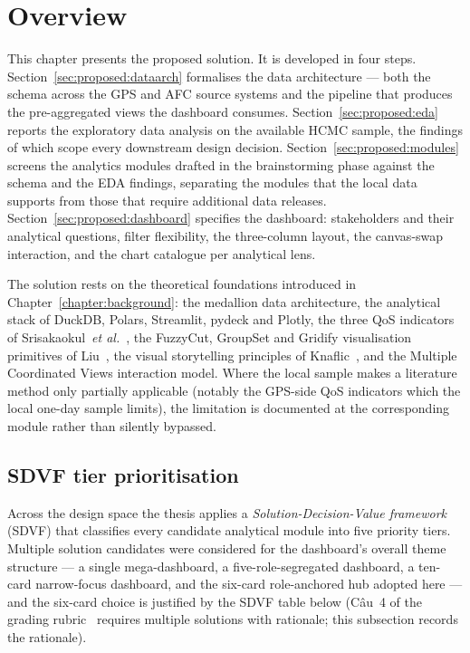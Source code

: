 \section{Overview}
\label{sec:proposed:overview}

This chapter presents the proposed solution. It is developed in
four steps. Section~\ref{sec:proposed:dataarch} formalises the
data architecture --- both the schema across the GPS and AFC
source systems and the pipeline that produces the
pre-aggregated views the dashboard consumes.
Section~\ref{sec:proposed:eda} reports the exploratory data
analysis on the available HCMC sample, the findings of which
scope every downstream design decision.
Section~\ref{sec:proposed:modules} screens the analytics
modules drafted in the brainstorming phase against the schema
and the EDA findings, separating the modules that the local
data supports from those that require additional data
releases. Section~\ref{sec:proposed:dashboard} specifies the
dashboard: stakeholders and their analytical questions, filter
flexibility, the three-column layout, the canvas-swap
interaction, and the chart catalogue per analytical lens.

The solution rests on the theoretical foundations introduced
in Chapter~\ref{chapter:background}: the medallion data
architecture, the analytical stack of DuckDB, Polars,
Streamlit, pydeck and Plotly, the three QoS indicators of
Srisakaokul~\textit{et al.}~\cite{srisakaokul2023}, the
FuzzyCut, GroupSet and Gridify visualisation primitives of
Liu~\cite{liu2022}, the visual storytelling principles of
Knaflic~\cite{knaflic2015}, and the Multiple Coordinated Views
interaction model. Where the local sample makes a literature
method only partially applicable (notably the GPS-side QoS
indicators which the local one-day sample limits), the
limitation is documented at the corresponding module rather
than silently bypassed.

\subsection{SDVF tier prioritisation}
\label{sec:proposed:sdvf}

Across the design space the thesis applies a
\emph{Solution-Decision-Value framework} (SDVF) that classifies
every candidate analytical module into five priority tiers.
Multiple solution candidates were considered for the dashboard's
overall theme structure --- a single mega-dashboard, a
five-role-segregated dashboard, a ten-card narrow-focus
dashboard, and the six-card role-anchored hub adopted here ---
and the six-card choice is justified by the SDVF table below
(Câu~4 of the grading rubric~\cite{rubric} requires multiple
solutions with rationale; this subsection records the rationale).

